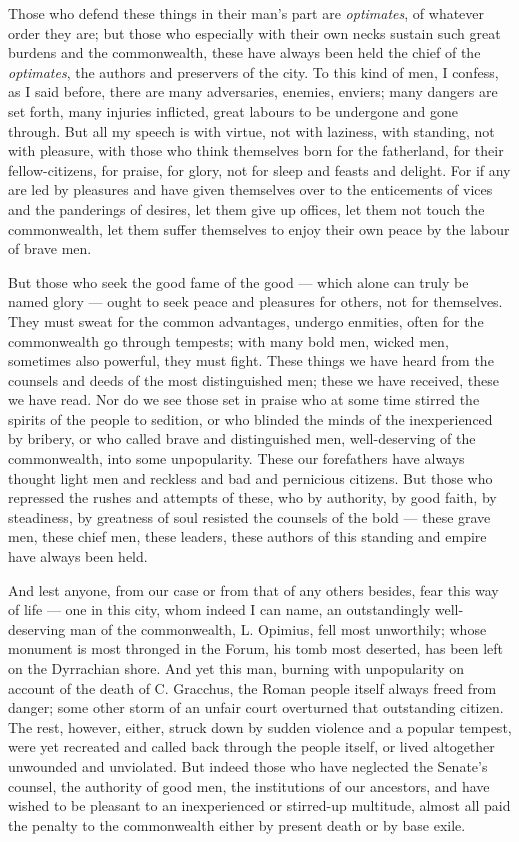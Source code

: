  Those who defend these things in their man's part are \textit{optimates}, of whatever order they are; but those who especially with their own necks sustain such great burdens and the commonwealth, these have always been held the chief of the \textit{optimates}, the authors and preservers of the city. To this kind of men, I confess, as I said before, there are many adversaries, enemies, enviers; many dangers are set forth, many injuries inflicted, great labours to be undergone and gone through. But all my speech is with virtue, not with laziness, with standing, not with pleasure, with those who think themselves born for the fatherland, for their fellow-citizens, for praise, for glory, not for sleep and feasts and delight. For if any are led by pleasures and have given themselves over to the enticements of vices and the panderings of desires, let them give up offices, let them not touch the commonwealth, let them suffer themselves to enjoy their own peace by the labour of brave men.

 But those who seek the good fame of the good --- which alone can truly be named glory --- ought to seek peace and pleasures for others, not for themselves. They must sweat for the common advantages, undergo enmities, often for the commonwealth go through tempests; with many bold men, wicked men, sometimes also powerful, they must fight. These things we have heard from the counsels and deeds of the most distinguished men; these we have received, these we have read. Nor do we see those set in praise who at some time stirred the spirits of the people to sedition, or who blinded the minds of the inexperienced by bribery, or who called brave and distinguished men, well-deserving of the commonwealth, into some unpopularity. These our forefathers have always thought light men and reckless and bad and pernicious citizens. But those who repressed the rushes and attempts of these, who by authority, by good faith, by steadiness, by greatness of soul resisted the counsels of the bold --- these grave men, these chief men, these leaders, these authors of this standing and empire have always been held.

 And lest anyone, from our case or from that of any others besides, fear this way of life --- one in this city, whom indeed I can name, an outstandingly well-deserving man of the commonwealth, L. Opimius, fell most unworthily; whose monument is most thronged in the Forum, his tomb most deserted, has been left on the Dyrrachian shore. And yet this man, burning with unpopularity on account of the death of C. Gracchus, the Roman people itself always freed from danger; some other storm of an unfair court overturned that outstanding citizen. The rest, however, either, struck down by sudden violence and a popular tempest, were yet recreated and called back through the people itself, or lived altogether unwounded and unviolated. But indeed those who have neglected the Senate's counsel, the authority of good men, the institutions of our ancestors, and have wished to be pleasant to an inexperienced or stirred-up multitude, almost all paid the penalty to the commonwealth either by present death or by base exile.

